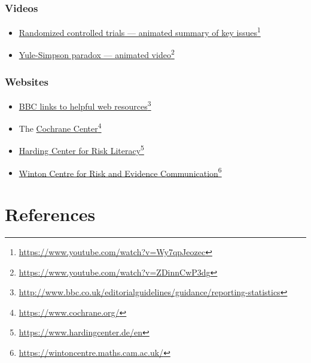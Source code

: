 \documentclass[
  10pt,
  b5paper]{book}
\providecommand{\tightlist}{%
  \setlength{\itemsep}{0pt}\setlength{\parskip}{0pt}}
\begin{document}
\hypertarget{videos}{%
\subsection*{Videos}\label{videos}}

\begin{itemize}
\tightlist
\item
  \href{https://www.youtube.com/watch?v=Wy7qpJeozec}{Randomized controlled trials --- animated summary of key issues}\footnote{\url{https://www.youtube.com/watch?v=Wy7qpJeozec}}
\item
  \href{https://www.youtube.com/watch?v=ZDinnCwP3dg}{Yule-Simpson paradox --- animated video}\footnote{\url{https://www.youtube.com/watch?v=ZDinnCwP3dg}}
\end{itemize}

\hypertarget{websites}{%
\subsection*{Websites}\label{websites}}

\begin{itemize}
\tightlist
\item
  \href{http://www.bbc.co.uk/editorialguidelines/guidance/reporting-statistics}{BBC links to helpful web resources}\footnote{\url{http://www.bbc.co.uk/editorialguidelines/guidance/reporting-statistics}}
\item
  The \href{https://www.cochrane.org/}{Cochrane Center}\footnote{\url{https://www.cochrane.org/}}
\item
  \href{https://www.hardingcenter.de/en}{Harding Center for Risk Literacy}\footnote{\url{https://www.hardingcenter.de/en}}
\item
  \href{https://wintoncentre.maths.cam.ac.uk/}{Winton Centre for Risk and Evidence Communication}\footnote{\url{https://wintoncentre.maths.cam.ac.uk/}}
\end{itemize}

\hypertarget{references}{%
\chapter*{References}\label{references}}
\end{document}
